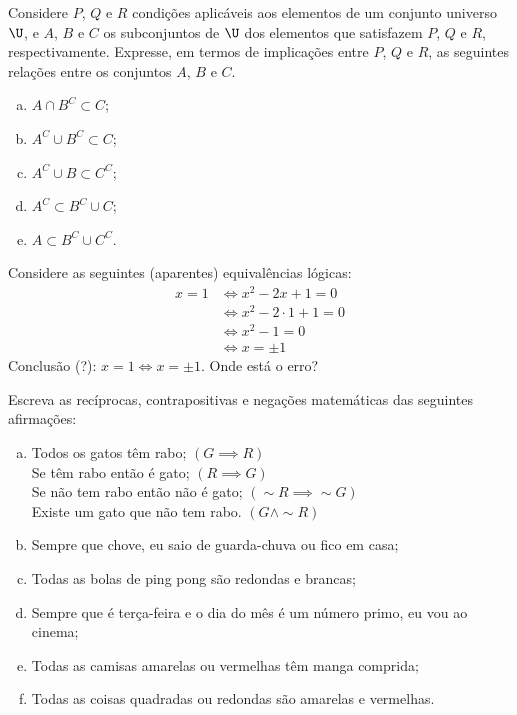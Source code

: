 \begin{exercise}
Considere $P$, $Q$ e $R$ condições aplicáveis aos elementos
de um conjunto universo $\U$, e $A$, $B$ e $C$ os subconjuntos de
$\U$ dos elementos que satisfazem $P$, $Q$ e $R$, respectivamente.
Expresse, em termos de implicações entre $P$, $Q$ e $R$, as
seguintes relações entre os conjuntos $A$, $B$ e $C$.
\begin{enumerate}[a.]
\item $A \cap B^C \subset C$;
\item $A^C \cup B^C \subset C$;
\item $A^C \cup B \subset C^C$;
\item $A^C \subset B^C \cup C$;
\item $A \subset B^C \cup C^C$.
\end{enumerate}
\end{exercise}

\begin{exercise}
Considere as seguintes (aparentes) equivalências lógicas:
\begin{align*}
x=1 & \iff x^2 -2x +1 = 0 \\
& \iff x^2 -2 \cdot 1 +1 =0 \\
& \iff x^2 - 1 =0 \\
& \iff x = \pm 1
\end{align*}
Conclusão (?): $x=1 \iff x= \pm 1$. Onde está o erro?
\end{exercise}

\begin{exercise}
\label{exe:escrever-reciprocas}
Escreva as recíprocas, contrapositivas e negações
matemáticas das seguintes afirmações:
\begin{enumerate}[a.]
  \item Todos os gatos têm rabo; $\left(G \implies R \right)$\\
   Se têm rabo então é gato; $\left(R \implies G \right)$\\
   Se não tem rabo então não é gato; $\left(\sim R \implies \sim G \right)$\\
   Existe um gato que não tem rabo. $\left(G \land \sim R \right)$
  \item Sempre que chove, eu saio de guarda-chuva ou fico em casa;
  \item Todas as bolas de ping pong são redondas e brancas;
  \item Sempre que é terça-feira e o dia do mês é um número primo,
  eu vou ao cinema;
  \item Todas as camisas amarelas ou vermelhas têm manga comprida;
  \item Todas as coisas quadradas ou redondas são amarelas e
  vermelhas.
\end{enumerate}
\end{exercise}

